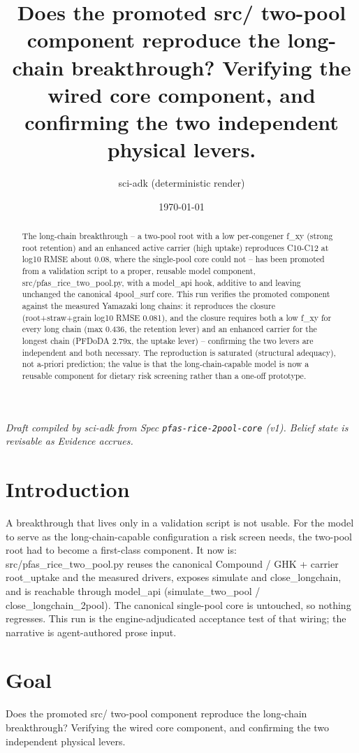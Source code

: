 \documentclass{article}
\title{Does the promoted src/ two-pool component reproduce the long-chain breakthrough? Verifying the wired core component, and confirming the two independent physical levers.}
\author{sci-adk (deterministic render)}
\date{\today}
\begin{document}
\maketitle

\noindent\textit{Draft compiled by sci-adk from Spec \texttt{pfas-rice-2pool-core} (v1). Belief state is revisable as Evidence accrues.}

\begin{abstract}
The long-chain breakthrough -- a two-pool root with a low per-congener f\_xy (strong root retention) and an enhanced active carrier (high uptake) reproduces C10-C12 at log10 RMSE about 0.08, where the single-pool core could not -- has been promoted from a validation script to a proper, reusable model component, src/pfas\_rice\_two\_pool.py, with a model\_api hook, additive to and leaving unchanged the canonical 4pool\_surf core. This run verifies the promoted component against the measured Yamazaki long chains: it reproduces the closure (root+straw+grain log10 RMSE 0.081), and the closure requires both a low f\_xy for every long chain (max 0.436, the retention lever) and an enhanced carrier for the longest chain (PFDoDA 2.79x, the uptake lever) -- confirming the two levers are independent and both necessary. The reproduction is saturated (structural adequacy), not a-priori prediction; the value is that the long-chain-capable model is now a reusable component for dietary risk screening rather than a one-off prototype.
\end{abstract}

\section{Introduction}
A breakthrough that lives only in a validation script is not usable. For the model to serve as the long-chain-capable configuration a risk screen needs, the two-pool root had to become a first-class component. It now is: src/pfas\_rice\_two\_pool.py reuses the canonical Compound / GHK + carrier root\_uptake and the measured drivers, exposes simulate and close\_longchain, and is reachable through model\_api (simulate\_two\_pool / close\_longchain\_2pool). The canonical single-pool core is untouched, so nothing regresses. This run is the engine-adjudicated acceptance test of that wiring; the narrative is agent-authored prose input.

\section{Goal}
Does the promoted src/ two-pool component reproduce the long-chain breakthrough? Verifying the wired core component, and confirming the two independent physical levers.
\end{document}
